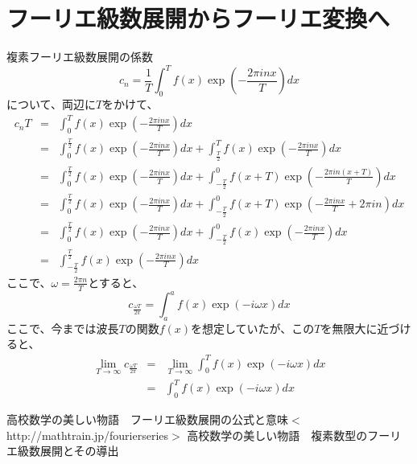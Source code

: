 \documentclass[a4paper]{jsarticle}
\begin{document}
\section{フーリエ級数展開からフーリエ変換へ}
複素フーリエ級数展開の係数
\begin{equation}
c_n = \frac { 1 } { T } \int _0 ^T f \left( x \right) \exp \left( - \frac { 2 \pi inx } { T } \right) dx
\end{equation}
について、両辺に$T$をかけて、
\begin{eqnarray}
	c_n T & = & \int _0 ^T f \left( x \right) \exp \left( - \frac { 2 \pi inx } { T } \right) dx \nonumber \\
	& = & \int _0 ^\frac { T } { 2 } f \left( x \right) \exp \left( - \frac { 2 \pi inx } { T } \right) dx + \int _\frac { T } { 2 } ^T f \left( x \right) \exp \left( - \frac { 2 \pi inx } { T } \right) dx \nonumber \\
	& = & \int _0 ^\frac { T } { 2 } f \left( x \right) \exp \left( - \frac { 2 \pi inx } { T } \right) dx + \int _{ - \frac { T } { 2 } } ^0 f \left( x + T \right) \exp \left( - \frac { 2 \pi in \left( x + T \right) } { T } \right) dx \nonumber \\
	& = & \int _0 ^\frac { T } { 2 } f \left( x \right) \exp \left( - \frac { 2 \pi inx } { T } \right) dx + \int _{ - \frac { T } { 2 } } ^0 f \left( x + T \right) \exp \left( - \frac { 2 \pi inx} { T } + 2 \pi in \right) dx \nonumber \\
	& = & \int _0 ^\frac { T } { 2 } f \left( x \right) \exp \left( - \frac { 2 \pi inx } { T } \right) dx + \int _{ - \frac { T } { 2 } } ^0 f \left( x \right) \exp \left( - \frac { 2 \pi inx } { T } \right) dx \nonumber \\
	& = & \int _{ - \frac { T } { 2 } } ^\frac { T } { 2 } f \left( x \right) \exp \left( - \frac { 2 \pi inx } { T } \right) dx
\end{eqnarray}
ここで、$ \omega = \frac { 2 \pi n } { T } $とすると、
\begin{equation}
c_\frac { \omega T } { 2 \pi } = \int _a ^a f \left( x \right) \exp \left( - i \omega x \right) dx
\end{equation}
ここで、今までは波長$ T $の関数$ f \left( x \right) $を想定していたが、この$ T $を無限大に近づけると、
\begin{eqnarray}
	\lim _{ T \to \infty } c_\frac { \omega T } { 2 \pi } & = & \lim _{ T \to \infty } \int _0 ^T f \left( x \right) \exp \left( - i \omega x \right) dx \nonumber \\
	& = & \int _0 ^T f \left( x \right) \exp \left( - i \omega x \right) dx
\end{eqnarray}
\begin{thebibliography}{9}
	高校数学の美しい物語　フーリエ級数展開の公式と意味$<$http://mathtrain.jp/fourierseries$>$
	高校数学の美しい物語　複素数型のフーリエ級数展開とその導出
\end{thebibliography}
\end{document}

